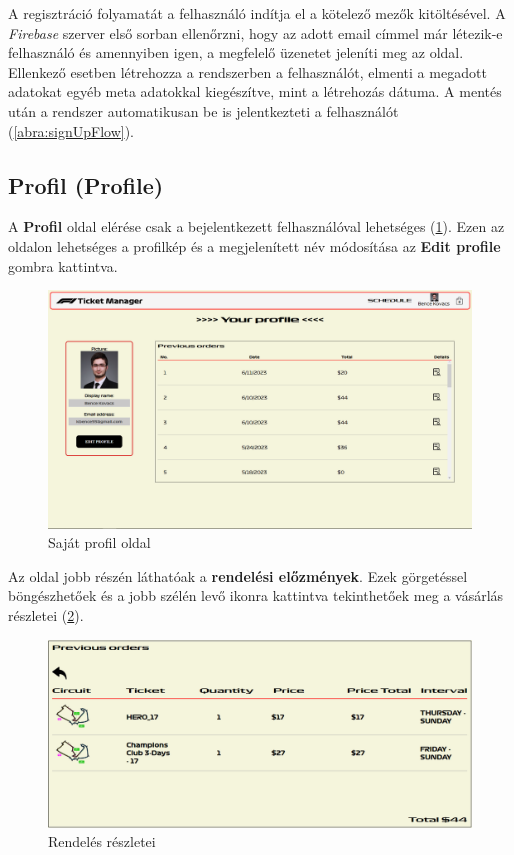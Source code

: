 A regisztráció folyamatát a felhasználó indítja el a kötelező mezők kitöltésével. A \textit{Firebase} szerver első sorban ellenőrzni, hogy az adott email címmel már létezik-e felhasználó és amennyiben igen, a megfelelő üzenetet jeleníti meg az oldal. Ellenkező esetben létrehozza a rendszerben a felhasználót, elmenti a megadott adatokat egyéb meta adatokkal kiegészítve, mint a létrehozás dátuma. A mentés után a rendszer automatikusan be is jelentkezteti a felhasználót (\ref{abra:signUpFlow}).

\subsection {Profil (Profile)}

A \textbf{Profil} oldal elérése csak a bejelentkezett felhasználóval lehetséges (\ref{abra:profile}). Ezen az oldalon lehetséges a profilkép és a megjelenített név módosítása az \textbf{Edit profile} gombra kattintva.

\begin{figure}[!h]
	\centering
	\includegraphics[scale=0.2]{images/profile}
	\caption{Saját profil oldal}
	\label{abra:profile}
\end{figure}

Az oldal jobb részén láthatóak a \textbf{rendelési előzmények}. Ezek görgetéssel böngészhetőek és a jobb szélén levő ikonra kattintva tekinthetőek meg a vásárlás részletei (\ref{abra:previousOrders}).

\begin{figure}[!h]
	\centering
	\includegraphics[scale=0.3]{images/previousOrders}
	\caption{Rendelés részletei}
	\label{abra:previousOrders}
\end{figure}

